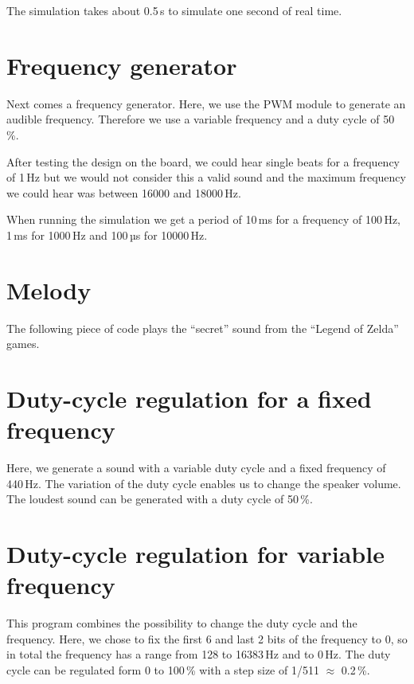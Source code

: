 The simulation takes about 0.5\,s to simulate one second of real time.

\section{Frequency generator}

Next comes a frequency generator. Here, we use the PWM module to generate an audible frequency. Therefore we use a variable frequency and a duty cycle of 50\,\%.





After testing the design on the board, we could hear single beats for a frequency of 1\,Hz but we would not consider this a valid sound and the maximum frequency we could hear was between 16000 and 18000\,Hz.

When running the simulation we get a period of 10\,ms for a frequency of 100\,Hz, 1\,ms for 1000\,Hz and 100\,µs for 10000\,Hz. 

\section{Melody}

The following piece of code plays the ``secret'' sound from the ``Legend of Zelda'' games.



\section{Duty-cycle regulation for a fixed frequency}

Here, we generate a sound with a variable duty cycle and a fixed frequency of 440\,Hz. The variation of the duty cycle enables us to change the speaker volume. The loudest sound can be generated with a duty cycle of 50\,\%. 




\section{Duty-cycle regulation for variable frequency}

This program combines the possibility to change the duty cycle and the frequency. Here, we chose to fix the first 6 and last 2 bits of the frequency to 0, so in total the frequency has a range from 128 to 16383\,Hz and to 0\,Hz. The duty cycle can be regulated form 0 to 100\,\% with a step size of 1/511 $\approx$ 0.2\,\%.



